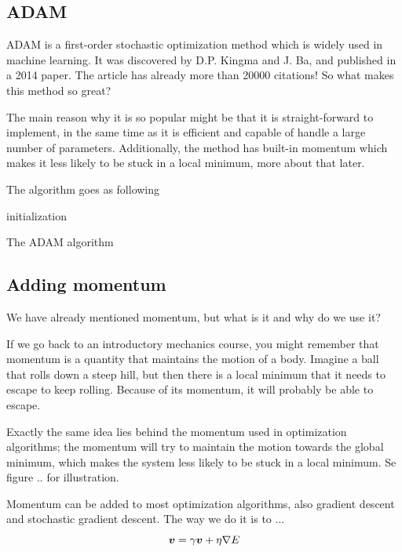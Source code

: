 \subsection{ADAM}
ADAM is a first-order stochastic optimization method which is widely used in machine learning. It was discovered by D.P. Kingma and J. Ba, and published in a 2014 paper. The article has already more than 20000 citations! \cite{kingma_adam:_2014} So what makes this method so great? 

The main reason why it is so popular might be that it is straight-forward to implement, in the same time as it is efficient and capable of handle a large number of parameters. Additionally, the method has built-in momentum which makes it less likely to be stuck in a local minimum, more about that later.

The algorithm goes as following

\begin{algorithm}[H]
\SetAlgoLined
{}
initialization\;
\caption{The ADAM algorithm}
\end{algorithm}

\subsection{Adding momentum} \label{sec:momentum}
We have already mentioned momentum, but what is it and why do we use it?

If we go back to an introductory mechanics course, you might remember that momentum is a quantity that maintains the motion of a body. Imagine a ball that rolls down a steep hill, but then there is a local minimum that it needs to escape to keep rolling. Because of its momentum, it will probably be able to escape. 

Exactly the same idea lies behind the momentum used in optimization algorithms; the momentum will try to maintain the motion towards the global minimum, which makes the system less likely to be stuck in a local minimum. Se figure .. for illustration. 

Momentum can be added to most optimization algorithms, also gradient descent and stochastic gradient descent. The way we do it is to ...
\begin{equation}
\boldsymbol{{v}} = \gamma\boldsymbol{{v}} + \eta\nabla E
\end{equation}

